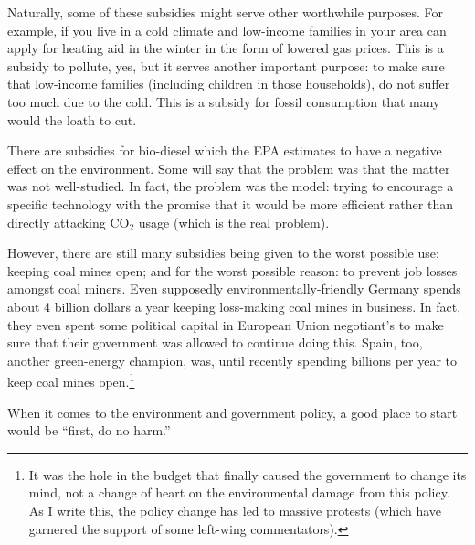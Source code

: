Naturally, some of these subsidies might serve other worthwhile purposes. For
example, if you live in a cold climate and low-income families in your area can
apply for heating aid in the winter in the form of lowered gas prices. This is
a subsidy to pollute, yes, but it serves another important purpose: to make
sure that low-income families (including children in those households), do not
suffer too much due to the cold. This is a subsidy for fossil consumption that
many would the loath to cut.


There are subsidies for bio-diesel which the EPA estimates to have a negative
effect on the environment. Some will say that the problem was that the matter was not well-studied.
In fact, the problem was the model: trying to encourage a specific technology
with the promise that it would be more efficient rather than directly attacking
CO${}_2$ usage (which is the real problem).

However, there are still many subsidies being given to the worst possible use:
keeping coal mines open; and for the worst possible reason: to prevent job
losses amongst coal miners. Even supposedly environmentally-friendly Germany
spends about 4 billion dollars a year keeping loss-making coal mines in
business. In fact, they even spent some political capital in European Union
negotiant's to make sure that their government was allowed to continue doing
this. Spain, too, another green-energy champion, was, until recently spending
billions per year to keep coal mines open.\footnote{It was the hole in the
budget that finally caused the government to change its mind, not a change of
heart on the environmental damage from this policy. As I write this, the policy
change has led to massive protests (which have garnered the support of some
left-wing commentators).}

When it comes to the environment and government policy, a good place to start
would be ``first, do no harm.''

